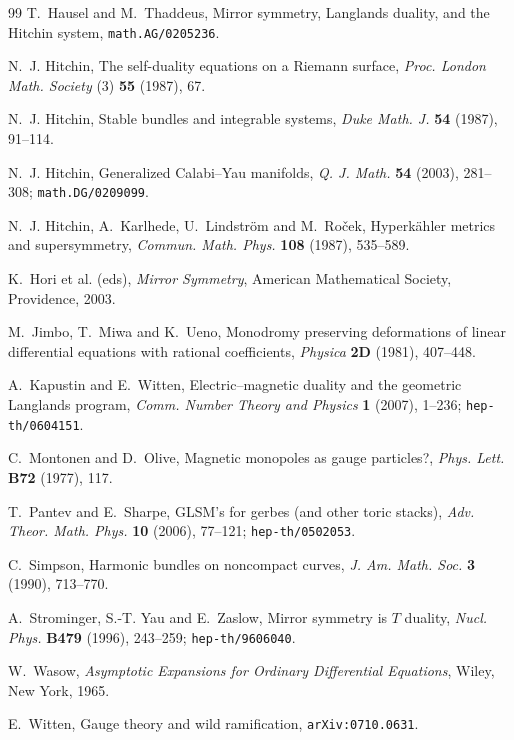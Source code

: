 \begin{thebibliography}{99}
T.~Hausel and M.~Thaddeus,
\newblock Mirror symmetry, Langlands duality, and the Hitchin system,
\newblock \texttt{math.AG/0205236}.

N.~J. Hitchin,
\newblock The self-duality equations on a Riemann surface,
\newblock \emph{Proc. London Math. Society} (3) \textbf{55} (1987), 67.

N.~J. Hitchin,
\newblock Stable bundles and integrable systems,
\newblock \emph{Duke Math. J.} \textbf{54} (1987), 91--114.

N.~J. Hitchin,
\newblock Generalized Calabi--Yau manifolds,
\newblock \emph{Q. J. Math.} \textbf{54} (2003), 281--308; \texttt{math.DG/0209099}.

N.~J. Hitchin, A.~Karlhede, U.~Lindstr\"om and M.~Ro\v{c}ek,
\newblock Hyperk\"ahler metrics and supersymmetry,
\newblock \emph{Commun. Math. Phys.} \textbf{108} (1987), 535--589.

K.~Hori et al. (eds),
\newblock \emph{Mirror Symmetry},
\newblock American Mathematical Society, Providence, 2003.

M.~Jimbo, T.~Miwa and K.~Ueno,
\newblock Monodromy preserving deformations of linear differential equations with rational coefficients,
\newblock \emph{Physica} \textbf{2D} (1981), 407--448.

A.~Kapustin and E.~Witten,
\newblock Electric--magnetic duality and the geometric Langlands program,
\newblock \emph{Comm. Number Theory and Physics} \textbf{1} (2007), 1--236; \texttt{hep-th/0604151}.

C.~Montonen and D.~Olive,
\newblock Magnetic monopoles as gauge particles?,
\newblock \emph{Phys. Lett.} \textbf{B72} (1977), 117.

T.~Pantev and E.~Sharpe,
\newblock GLSM's for gerbes (and other toric stacks),
\newblock \emph{Adv. Theor. Math. Phys.} \textbf{10} (2006), 77--121; \texttt{hep-th/0502053}.

C.~Simpson,
\newblock Harmonic bundles on noncompact curves,
\newblock \emph{J. Am. Math. Soc.} \textbf{3} (1990), 713--770.

A.~Strominger, S.-T. Yau and E.~Zaslow,
\newblock Mirror symmetry is $T$ duality,
\newblock \emph{Nucl. Phys.} \textbf{B479} (1996), 243--259; \texttt{hep-th/9606040}.

W.~Wasow,
\newblock \emph{Asymptotic Expansions for Ordinary Differential Equations},
\newblock Wiley, New York, 1965.

E.~Witten,
\newblock Gauge theory and wild ramification,
\newblock \texttt{arXiv:0710.0631}.

\end{thebibliography}

